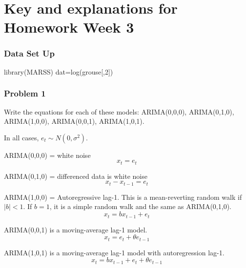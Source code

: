 
\setlength{\parskip}{1em}



\chapter{Key and explanations for Homework Week 3}
\subsection*{Data Set Up}
\begin{Schunk}
\begin{Sinput}
 library(MARSS)
 dat=log(grouse[,2])
\end{Sinput}
\end{Schunk}

\subsection*{Problem 1}
\item Write the equations for each of these models: ARIMA(0,0,0), ARIMA(0,1,0), ARIMA(1,0,0), ARIMA(0,0,1), ARIMA(1,0,1).  

In all cases, $e_t \sim N(0,\sigma^2)$.

ARIMA(0,0,0) = white noise
$$x_t = e_t$$

ARIMA(0,1,0) = differenced data is white noise
$$x_t - x_{t-1} = e_t$$

ARIMA(1,0,0) = Autoregressive lag-1.  This is a mean-reverting random walk if $|b|<1$. If $b=1$, it is a simple random walk and the same as ARIMA(0,1,0).
$$x_t = bx_{t-1} + e_t$$

ARIMA(0,0,1) is a moving-average lag-1 model.
$$x_t = e_t + \theta e_{t-1}$$

ARIMA(1,0,1) is a moving-average lag-1 model with autoregression lag-1.
$$x_t = b x_{t-1} + e_t + \theta e_{t-1}$$


